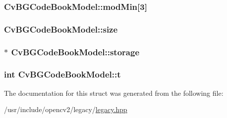 \hypertarget{structCvBGCodeBookModel_ab9474e810907e21b77f89a4ed63a4f97}{
\subsubsection[{mod\-Min}]{ Cv\-B\-G\-Code\-Book\-Model\-::mod\-Min\mbox{[}3\mbox{]}}}\label{structCvBGCodeBookModel_ab9474e810907e21b77f89a4ed63a4f97}
\hypertarget{structCvBGCodeBookModel_ac0189344d2ee3ea3a4d79b0179a49b9e}{
\subsubsection[{size}]{ Cv\-B\-G\-Code\-Book\-Model\-::size}}\label{structCvBGCodeBookModel_ac0189344d2ee3ea3a4d79b0179a49b9e}
\hypertarget{structCvBGCodeBookModel_af6dbfa6932fafbeeaf6e8f47f171f4ce}{
\subsubsection[{storage}]{$\ast$ Cv\-B\-G\-Code\-Book\-Model\-::storage}}\label{structCvBGCodeBookModel_af6dbfa6932fafbeeaf6e8f47f171f4ce}
\hypertarget{structCvBGCodeBookModel_a717a48bfd25d92aa1733ef8a94124949}{
\subsubsection[{t}]{\setlength{\rightskip}{0pt plus 5cm}int Cv\-B\-G\-Code\-Book\-Model\-::t}}\label{structCvBGCodeBookModel_a717a48bfd25d92aa1733ef8a94124949}


The documentation for this struct was generated from the following file\-:\begin{DoxyCompactItemize}
\item 
/usr/include/opencv2/legacy/\hyperlink{legacy_8hpp}{legacy.\-hpp}\end{DoxyCompactItemize}
